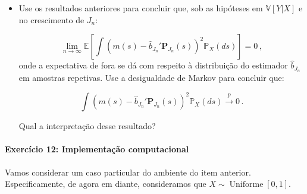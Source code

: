 \documentclass[10pt,a4paper]{article}
\begin{document}
\begin{itemize}
 	$$\lim_{n \to \infty}\mathbb{E}[\lVert \hat{b}_{J_n} - \beta_{J_n} \rVert_2^2] = 0 \, .$$
 	
 	Use a desigualdade de Markov para concluir que $\lVert \hat{b}_{J_n} - \beta_{J_n} \rVert_2 \overset{p}{\to} 0$.
 	
 	\item[e] Use os resultados anteriores para concluir que, sob as hipóteses em $\mathbb{V}[Y|X]$ e no crescimento de $J_n$:
 	
 	$$\lim_{n\to \infty}\mathbb{E}\left[\int(m(s) - \hat{b}_{J_n}'\boldsymbol{P}_{J_n}(s))^2\mathbb{P}_X(ds)\right] = 0\, ,$$
 	onde a expectativa de fora se dá com respeito à distribuição do estimador  $\hat{b}_{J_n}$ em amostras repetivas. Use a desigualdade de Markov para concluir que:
 	
 	$$\int(m(s) - \hat{b}_{J_n}'\boldsymbol{P}_{J_n}(s))^2\mathbb{P}_X(ds) \overset{p}{\to} 0 \, .$$
 	
 	Qual a interpretação desse resultado?
 \end{itemize}
 \paragraph{Exercício 12: Implementação computacional} Vamos considerar um caso particular do ambiente do item anterior. Especificamente, de agora em diante, consideramos que $X \sim \operatorname{Uniforme}[0,1]$.
 
\end{document}
